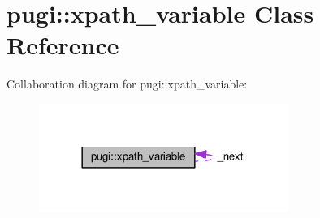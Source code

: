 \hypertarget{classpugi_1_1xpath__variable}{\section{pugi\+:\+:xpath\+\_\+variable Class Reference}
\label{classpugi_1_1xpath__variable}
}


Collaboration diagram for pugi\+:\+:xpath\+\_\+variable\+:
\nopagebreak
\begin{figure}[H]
\begin{center}
\leavevmode
\includegraphics[width=230pt]{classpugi_1_1xpath__variable__coll__graph}
\end{center}
\end{figure}
